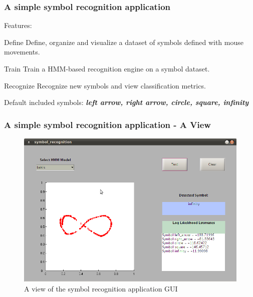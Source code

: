 \begin{frame}[t]
	\frametitle{A simple symbol recognition application}
	Features:
	\pause
	\begin{block}{Define}
		Define, organize and visualize a dataset of symbols defined with mouse movements.
	\end{block}
	\pause
	
	\begin{block}{Train}
		Train a HMM-based recognition engine on a symbol dataset.
	\end{block}
	\pause
	
	\begin{block}{Recognize}
		Recognize new symbols and view classification metrics.
	\end{block}
	\pause
	
	\begin{block}{}
		Default included symbols: \textbf{\emph{left arrow, right arrow, circle, square, infinity}}
	\end{block}
\end{frame}

\begin{frame}[t]
	\frametitle{A simple symbol recognition application - A View}
	
	\begin{figure}
  		\centering
		\includegraphics[height=0.70\textheight]{graphics/demo-app/infinity.png}
		\caption{\tiny{A view of the symbol recognition application GUI}}
		\label{fig:baum-welch-alg}
  	\end{figure}	
\end{frame}

